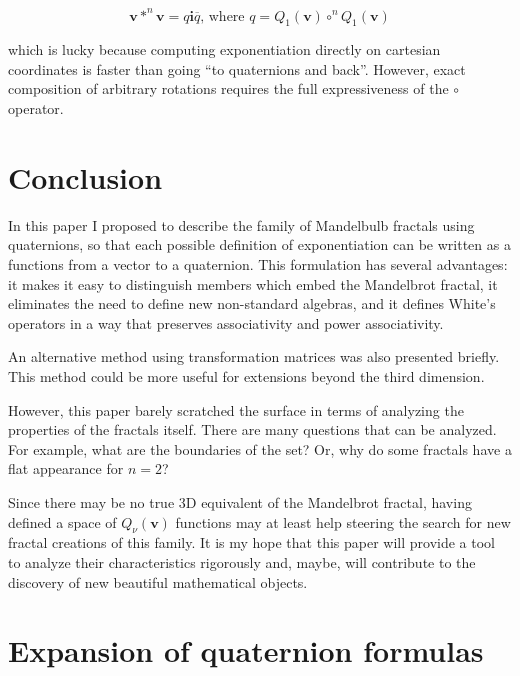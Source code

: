 \documentclass{article}
\let\vec\mathbf
\let\bar\overline
\newcommand{\where}{\text{, where }}
\begin{document}
\begin{equation*}
\vec{v} \ast^{n} \vec{v} = q\vec{i}\bar q
   \where  q=Q_1(\vec{v}) \circ^{n} Q_1(\vec{v})
\end{equation*}

\noindent
which is lucky because computing exponentiation directly on cartesian
coordinates is faster than going ``to quaternions and back''.
However, exact composition of arbitrary rotations requires the full
expressiveness of the $\circ$ operator.

\section{Conclusion}
\label{sec:concl}

In this paper I proposed to describe the family of Mandelbulb fractals
using quaternions, so that each possible definition of exponentiation
can be written as a functions from a vector to a quaternion.  This
formulation has several advantages: it makes it easy to distinguish
members which embed the Mandelbrot fractal, it eliminates the need to
define new non-standard algebras, and it defines White's operators in
a way that preserves associativity and power associativity.

An alternative method using transformation matrices was also presented
briefly.  This method could be more useful for extensions beyond the
third dimension.

However, this paper barely scratched the surface in terms of analyzing
the properties of the fractals itself.  There are many questions that
can be analyzed.  For example, what are the boundaries of the set?
Or, why do some fractals have a flat appearance for $n = 2$?

Since there may be no true 3D equivalent of the Mandelbrot fractal,
having defined a space of $Q_\nu(\vec{v})$ functions may at least help
steering the search for new fractal creations of this family.  It is
my hope that this paper will provide a tool to analyze their
characteristics rigorously and, maybe, will contribute to the
discovery of new beautiful mathematical objects.

\newpage
\appendix
\section{Expansion of quaternion formulas}
\end{document}
